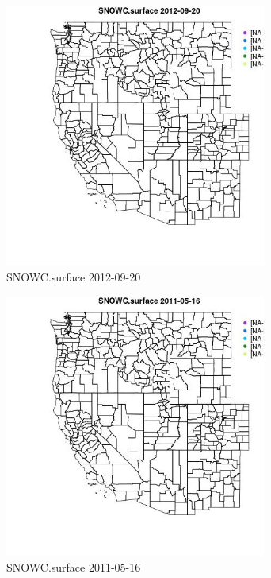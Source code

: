 \begin{figure} 
\centering  
\includegraphics[width=0.77\textwidth]{Code_Outputs/ML_input_report_ML_input_PM25_Step5_part_d_de_duplicated_aves_ML_input_MapObsSNOWCsurface2012-09-20.jpg} 
\caption{\label{fig:ML_input_report_ML_input_PM25_Step5_part_d_de_duplicated_aves_ML_inputMapObsSNOWCsurface2012-09-20}SNOWC.surface 2012-09-20} 
\end{figure} 
 

\clearpage 

\begin{figure} 
\centering  
\includegraphics[width=0.77\textwidth]{Code_Outputs/ML_input_report_ML_input_PM25_Step5_part_d_de_duplicated_aves_ML_input_MapObsSNOWCsurface2011-05-16.jpg} 
\caption{\label{fig:ML_input_report_ML_input_PM25_Step5_part_d_de_duplicated_aves_ML_inputMapObsSNOWCsurface2011-05-16}SNOWC.surface 2011-05-16} 
\end{figure} 
 

